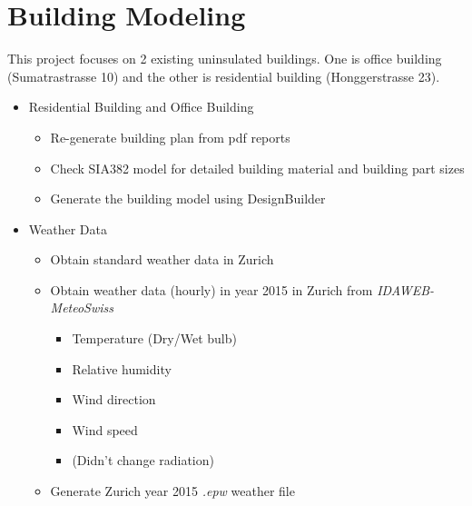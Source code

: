 \documentclass[11pt, a4paper]{article}
\theoremstyle{definition}
\begin{document}
\section{Building Modeling}
	This project focuses on 2 existing uninsulated buildings. One is office building (Sumatrastrasse 10) and the other is residential building (Honggerstrasse 23).\\
	\begin{itemize}
		\item Residential Building and Office Building
			\begin{itemize}
				\item Re-generate building plan from pdf reports
				\item Check SIA382 model for detailed building material and building part sizes
				\item Generate the building model using DesignBuilder
			\end{itemize}
		\item Weather Data
			\begin{itemize}
				\item Obtain standard weather data in Zurich
				\item Obtain weather data (hourly) in year 2015 in Zurich from \textit{IDAWEB-MeteoSwiss}
					\begin{itemize}
						\item Temperature (Dry/Wet bulb)
						\item Relative humidity
						\item Wind direction
						\item Wind speed
						\item (Didn't change radiation)
					\end{itemize}
				\item Generate Zurich year 2015 \textit{.epw} weather file 
			\end{itemize}	
	\end{itemize}
\end{document}
